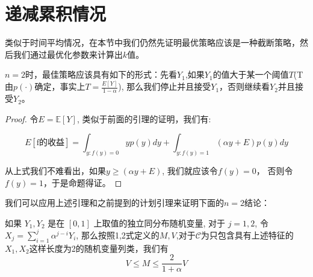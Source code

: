 \documentclass[bachelor]{thuthesis}
\begin{document}
\section{递减累积情况}

类似于时间平均情况，在本节中我们仍然先证明最优策略应该是一种截断策略，然后我们通过最优化参数来计算出$k$值。

\begin{lemma}

$n=2$时，最佳策略应该具有如下的形式：先看$Y_1$,如果$Y_1$的值大于某一个阈值$T$(T由$p(\cdot)$确定，事实上$T=\frac{E[Y]}{1-\alpha}$), 那么我们停止并且接受$Y_1$，否则继续看$Y_2$并且接受$Y_2$。

\end{lemma}

\begin{proof}

令$E=\mathbb{E}[Y]$, 类似于前面的引理的证明，我们有:

\[E[\text{f的收益}]=\int_{y:f(y)=0} yp(y)dy + \int_{y:f(y)=1} (\alpha y+E)p(y)dy\]

从上式我们不难看出，如果$y\ge (\alpha y+E)$, 我们就应该令$f(y)=0$， 否则令$f(y)=1$，于是命题得证。

\end{proof}

我们可以应用上述引理和之前提到的计划引理来证明下面的$n=2$结论：

\begin{theorem}

如果 $Y_1,Y_2$ 是在 $[0,1]$ 上取值的独立同分布随机变量, 对于 $j=1,2$, 令 $X_j=\sum_{i=1}^{j}\alpha^{j-i}Y_i$, 那么按照1,2式定义的$M,V$,对于$\mathcal{C}$为只包含具有上述特征的$X_1,X_2$这样长度为2的随机变量列类，我们有
\[V\le M\le \frac{2}{1+\alpha}V\]

\end{theorem}
\end{document}
